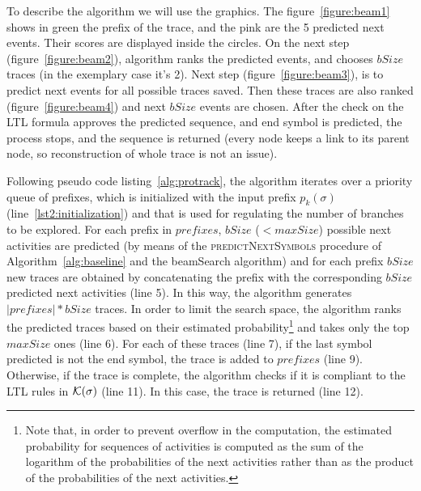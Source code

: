 To describe the algorithm we will use the graphics. The figure~\ref{figure:beam1} shows in green the prefix of the trace, and the pink are the 5 predicted next events. Their scores are displayed inside the circles. On the next step (figure~\ref{figure:beam2}), algorithm ranks the predicted events, and chooses $bSize$ traces (in the exemplary case it's 2). Next step (figure~\ref{figure:beam3}), is to predict next events for all possible traces saved. Then these traces are also ranked (figure~\ref{figure:beam4}) and next $bSize$ events are chosen. After the check on the LTL formula approves the predicted sequence, and end symbol is predicted, the process stops, and the sequence is returned (every node keeps a link to its parent node, so reconstruction of whole trace is not an issue).

Following pseudo code listing~\ref{alg:protrack}, the algorithm iterates over a priority queue of prefixes, which is initialized with the input prefix $p_k(\sigma)$ (line~\ref{lst2:initialization}) and that is used for regulating the number of branches to be explored. For each prefix in $prefixes$, $bSize$ ($< maxSize$) possible next activities are predicted (by means of the \textsc{predictNextSymbols} procedure of Algorithm~\ref{alg:baseline} and the beamSearch algorithm) and for each prefix $bSize$ new traces are obtained by concatenating the prefix with the corresponding $bSize$ predicted next activities (line 5). In this way, the algorithm generates $\left|prefixes\right|*bSize$ traces. In order to limit the search space, the algorithm ranks the predicted traces based on their estimated probability\footnote{Note that, in order to prevent overflow in the computation, the estimated probability for sequences of activities is computed as the sum of the logarithm of the probabilities of the next activities rather than as the product of the probabilities of the next activities.} and takes only the top $maxSize$ ones (line 6). For each of these traces (line 7), if the last symbol predicted is not the end symbol, the trace is added to $prefixes$ (line 9). Otherwise, if the trace is complete, the algorithm checks if it is compliant to the LTL rules in $\cal{K}(\sigma)$ (line 11). In this case, the trace is returned (line 12).
